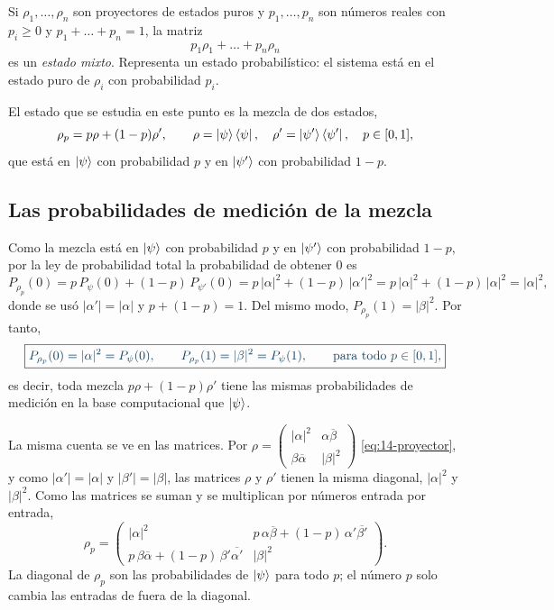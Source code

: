 \begin{definicionT}
Si $\rho_1,\dots,\rho_n$ son proyectores de estados puros y $p_1,\dots,p_n$ son números reales
con $p_i\ge0$ y $p_1+\dots+p_n=1$, la matriz
\[
  p_1\rho_1+\dots+p_n\rho_n
\]
es un \emph{estado mixto}. Representa un estado probabilístico: el sistema está en el estado
puro de $\rho_i$ con probabilidad $p_i$.
\end{definicionT}

El estado que se estudia en este punto es la mezcla de dos estados,
\begin{equation}\label{eq:14-mezcla}
  \rho_p=p\rho+(1-p)\rho',\qquad \rho=\lvert \psi\rangle\bra\psi,\quad \rho'=\lvert \psi'\rangle\bra{\psi'},
  \quad p\in[0,1],
\end{equation}
que está en $\lvert \psi\rangle$ con probabilidad $p$ y en $\lvert \psi'\rangle$ con probabilidad $1-p$.

\subsection*{Las probabilidades de medición de la mezcla}

Como la mezcla está en $\lvert \psi\rangle$ con probabilidad $p$ y en $\lvert \psi'\rangle$ con probabilidad $1-p$,
por la ley de probabilidad total la probabilidad de obtener $0$ es
\[
  P_{\rho_p}(0)=p\,P_\psi(0)+(1-p)\,P_{\psi'}(0)=p\,|\alpha|^2+(1-p)\,|\alpha'|^2
  =p\,|\alpha|^2+(1-p)\,|\alpha|^2=|\alpha|^2 ,
\]
donde se usó $|\alpha'|=|\alpha|$ y $p+(1-p)=1$. Del mismo modo, $P_{\rho_p}(1)=|\beta|^2$. Por tanto,
\[
  \destacado{P_{\rho_p}(0)=|\alpha|^2=P_\psi(0),\qquad P_{\rho_p}(1)=|\beta|^2=P_\psi(1),
  \qquad\text{para todo }p\in[0,1],}
\]
es decir, toda mezcla $p\rho+(1-p)\rho'$ tiene las mismas probabilidades de medición en la base
computacional que $\lvert \psi\rangle$.

La misma cuenta se ve en las matrices. Por $\rho=\begin{pmatrix}|\alpha|^2 & \alpha\overline\beta\\ \beta\overline\alpha & |\beta|^2\end{pmatrix}$ \eqref{eq:14-proyector}, y como $|\alpha'|=|\alpha|$ y
$|\beta'|=|\beta|$, las matrices $\rho$ y $\rho'$ tienen la misma diagonal, $|\alpha|^2$ y
$|\beta|^2$. Como las matrices se suman y se multiplican por números entrada por entrada,
\begin{equation}\label{eq:14-rho-p}
  \rho_p=\begin{pmatrix}
     |\alpha|^2 & p\,\alpha\overline\beta+(1-p)\,\alpha'\overline{\beta'}\\[2pt]
     p\,\beta\overline\alpha+(1-p)\,\beta'\overline{\alpha'} & |\beta|^2
   \end{pmatrix}.
\end{equation}
La diagonal de $\rho_p$ son las probabilidades de $\lvert \psi\rangle$ para todo $p$; el número $p$ solo
cambia las entradas de fuera de la diagonal.

